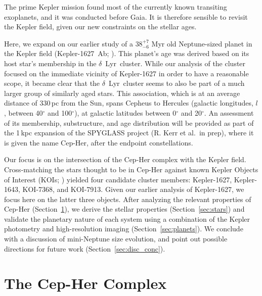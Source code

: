 \documentclass[12pt,twocolumn,tighten,linenumbers]{aastex63}
\begin{document}
The prime Kepler mission \citep{borucki_kepler_2010} found most of the
currently known transiting exoplanets, and it was conducted before
Gaia.  It is therefore sensible to revisit the Kepler field, given our
new constraints on the stellar ages.

Here, we expand on our earlier study of a $38^{+7}_{-6}$ Myr old
Neptune-sized planet in the Kepler field (Kepler-1627~Ab;
\citealt{bouma_kep1627_2022}).  This planet's age was derived based on
its host star's membership in the $\delta$\ Lyr\ cluster.  While our
analysis of the cluster focused on the immediate vicinity of
Kepler-1627 in order to have a reasonable scope,  it became clear that
the $\delta$\ Lyr\ cluster seems to also be part of a much larger
group of similarly aged stars.  This association, which is at an
average distance of 330\,pc from the Sun, spans Cepheus to Hercules
(galactic longitudes, $l$, between 40$^\circ$ and 100$^\circ$), at
galactic latitudes between 0$^\circ$ and 20$^\circ$.  An assessment of
its membership, substructure, and age distribution will be provided as
part of the 1\,kpc expansion of the SPYGLASS project (R. Kerr et al.\
in prep), where it is given the name Cep-Her, after the endpoint
constellations.

Our focus is on the intersection of the Cep-Her complex with the
Kepler field.  Cross-matching the stars thought to be in Cep-Her against known Kepler
Objects of Interest (KOIs; \citealt{thompson_planetary_2018}) yielded
four candidate cluster members: Kepler-1627, Kepler-1643, KOI-7368,
and KOI-7913.  Given our earlier analysis of Kepler-1627, we focus
here on the latter three objects.  After analyzing the relevant
properties of Cep-Her (Section~\ref{sec:cluster}), we derive the
stellar properties (Section~\ref{sec:stars}) and validate the
planetary nature of each system using a combination of the Kepler
photometry and high-resolution imaging (Section~\ref{sec:planets}).
We conclude with a discussion of mini-Neptune size evolution, and
point out possible directions for future work
(Section~\ref{sec:disc_conc}).

\section{The Cep-Her Complex}
\label{sec:cluster}
\end{document}
